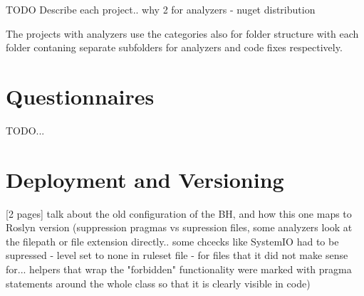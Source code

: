 \documentclass[
  digital, %
  table,   %
  lof,     %
  lot,     %
  oneside,
]{fithesis3}
\begin{document}
TODO Describe each project.. why 2 for analyzers - nuget distribution

The projects with analyzers use the categories also for folder structure with each folder contaning separate subfolders for analyzers and code fixes respectively.
  \chapter{Questionnaires}
TODO...

  \chapter{Deployment and Versioning}
[2 pages]
talk about the old configuration of the BH, and how this one maps to Roslyn version (suppression pragmas vs supression files, some analyzers look at the filepath or file extension directly.. some chcecks like SystemIO had to be supressed - level set to none in ruleset file - for files that it did not make sense for... helpers that wrap the "forbidden" functionality were marked with pragma statements around the whole class so that it is clearly visible in code)
\end{document}
